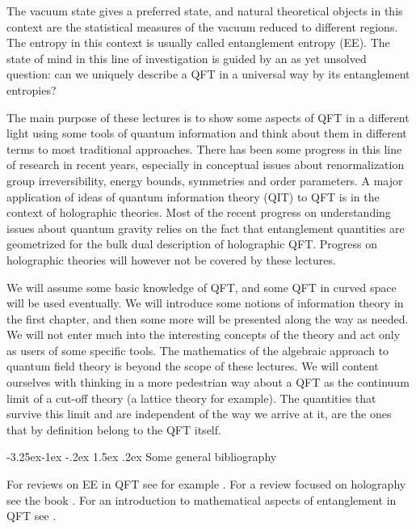 \documentclass[11pt]{article}
\makeatletter
\renewcommand\subsection{\@startsection{subsection}{2}{\z@}%
                                   {-3.25ex\@plus -1ex \@minus -.2ex}%
                                     {1.5ex \@plus .2ex}%
                                     {\normalfont\bfseries}}
\numberwithin{equation}{section}
\makeatother
\begin{document}
The vacuum state gives a preferred state, and natural theoretical objects in this context are the statistical measures of the vacuum reduced to different regions. The entropy in this context is usually called entanglement entropy (EE). The state of mind in this line of investigation is guided by an as yet unsolved question: can we uniquely describe a QFT in a universal way by its entanglement entropies?   
   
The main purpose of these lectures is to show some aspects of QFT in a different light using some tools of quantum information and think about them in different terms to most traditional approaches. There has been some progress in this line of research in recent years, especially in conceptual issues about renormalization group irreversibility, energy bounds, symmetries and order parameters. A major application of ideas of quantum information theory (QIT) to QFT is in the context of holographic theories. Most of the recent progress on understanding issues about quantum gravity relies on the fact that entanglement quantities are geometrized for the bulk dual description of holographic QFT. Progress on holographic theories will however not be covered by these lectures.    

We will assume some basic knowledge of QFT, and some QFT in curved space will be used eventually. We will introduce some notions of information theory in the first chapter, and then some more will be presented along the way as needed. We will not enter much into the interesting concepts of the theory and act only as users of some specific tools. The mathematics of the algebraic approach to quantum field theory is beyond the scope of these lectures. We will content ourselves with thinking in a more pedestrian way about a QFT as the continuum limit of a cut-off theory (a lattice theory for example).  
 The quantities that survive this limit and are independent of the way we arrive at it, are the ones that by definition belong to the QFT itself. 

\subsection{Some general bibliography}

For reviews on EE in QFT see for example \cite{Nishioka:2018khk,Calabrese:2009qy,Casini:2009sr}. 
For a review focused on holography see the book \cite{rangamani2017holographic}.
For an introduction to mathematical aspects of entanglement in QFT see \cite{Witten:2018lha, Hollands:2017dov}.
\end{document}
